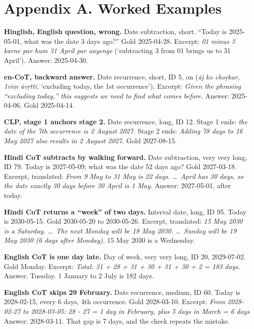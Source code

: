 \section*{Appendix A. Worked Examples}

\noindent\textbf{Hinglish, English question, wrong.} Date subtraction, short. ``Today is 2025-05-01, what was the date 3 days ago?'' Gold 2025-04-28. Excerpt: \emph{01 minus 3 karne par hum 31 April par aayenge} (`subtracting 3 from 01 brings us to 31 April'). Answer: 2025-04-30.

\smallskip
\noindent\textbf{en-CoT, backward answer.} Date recurrence, short, ID 5, on  (\emph{āj ko choṛkar, 1vīṃ āvṛtti}, `excluding today, the 1st occurrence'). Excerpt: \emph{Given the phrasing ``excluding today,'' this suggests we need to find what comes before.} Answer: 2025-04-06. Gold 2025-04-14.

\smallskip
\noindent\textbf{CLP, stage 1 anchors stage 2.} Date recurrence, long, ID 12. Stage 1 ends: \emph{the date of the 7th occurrence is 2 August 2027.} Stage 2 ends: \emph{Adding 78 days to 16 May 2027 also results in 2 August 2027.} Gold 2027-08-15.

\smallskip
\noindent\textbf{Hindi CoT subtracts by walking forward.} Date subtraction, very very long, ID 79. Today is 2027-05-09; what was the date 52 days ago? Gold 2027-03-18. Excerpt, translated: \emph{From 9 May to 31 May is 22 days. \dots\ April has 30 days, so the date exactly 30 days before 30 April is 1 May.} Answer: 2027-05-01, after today.

\smallskip
\noindent\textbf{Hindi CoT returns a ``week'' of two days.} Interval date, long, ID 95. Today is 2030-05-15. Gold 2030-05-20 to 2030-05-26. Excerpt, translated: \emph{15 May 2030 is a Saturday. \dots\ The next Monday will be 18 May 2030. \dots\ Sunday will be 19 May 2030 (6 days after Monday).} 15 May 2030 is a Wednesday.

\smallskip
\noindent\textbf{English CoT is one day late.} Day of week, very very long, ID 20, 2029-07-02. Gold Monday. Excerpt: \emph{Total: 31 + 28 + 31 + 30 + 31 + 30 + 2 = 183 days.} Answer: Tuesday. 1 January to 2 July is 182 days.

\smallskip
\noindent\textbf{English CoT skips 29 February.} Date recurrence, medium, ID 60. Today is 2028-02-15, every 6 days, 4th occurrence. Gold 2028-03-10. Excerpt: \emph{From 2028-02-27 to 2028-03-05: 28 - 27 = 1 day in February, plus 5 days in March = 6 days \ok} Answer: 2028-03-11. That gap is 7 days, and the check repeats the mistake.

